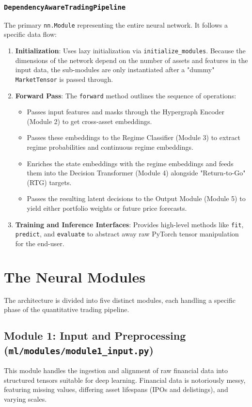 \documentclass[12pt,a4paper]{report}
\begin{document}
\subsection{\texttt{DependencyAwareTradingPipeline}}
The primary \texttt{nn.Module} representing the entire neural network. It follows a specific data flow:
\begin{enumerate}
    \item \textbf{Initialization}: Uses lazy initialization via \texttt{initialize\_modules}. Because the dimensions of the network depend on the number of assets and features in the input data, the sub-modules are only instantiated after a "dummy" \texttt{MarketTensor} is passed through.
    \item \textbf{Forward Pass}: The \texttt{forward} method outlines the sequence of operations:
    \begin{itemize}
        \item Passes input features and masks through the Hypergraph Encoder (Module 2) to get cross-asset embeddings.
        \item Passes these embeddings to the Regime Classifier (Module 3) to extract regime probabilities and continuous regime embeddings.
        \item Enriches the state embeddings with the regime embeddings and feeds them into the Decision Transformer (Module 4) alongside "Return-to-Go" (RTG) targets.
        \item Passes the resulting latent decisions to the Output Module (Module 5) to yield either portfolio weights or future price forecasts.
    \end{itemize}
    \item \textbf{Training and Inference Interfaces}: Provides high-level methods like \texttt{fit}, \texttt{predict}, and \texttt{evaluate} to abstract away raw PyTorch tensor manipulation for the end-user.
\end{enumerate}

\chapter{The Neural Modules}

The architecture is divided into five distinct modules, each handling a specific phase of the quantitative trading pipeline.

\section{Module 1: Input and Preprocessing (\texttt{ml/modules/module1\_input.py})}
This module handles the ingestion and alignment of raw financial data into structured tensors suitable for deep learning. Financial data is notoriously messy, featuring missing values, differing asset lifespans (IPOs and delistings), and varying scales.
\end{document}

